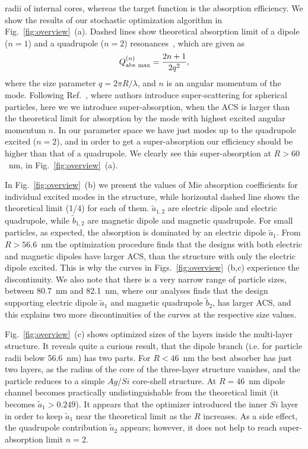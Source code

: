 \documentclass[aps,prl,twocolumn,showpacs,superscriptaddress,groupedaddress]{revtex4-1}
\begin{document}
radii of internal cores, whereas the target function is the absorption
efficiency.  We show the results of our stochastic optimization algorithm
in Fig.~\ref{fig:overview}~(a).  Dashed lines show theoretical absorption
limit of a dipole ($n=1$) and a quadrupole ($n=2$)
resonances~\cite{Tribelsky-2011}, which are given as $$Q^{(n)}_{\rm
  abs\ max}=\frac{2n+1}{2q^2},$$ where the size parameter $q=2\pi
R/\lambda$, and $n$ is an angular momentum of the mode. Following
Ref.~\cite{Fan-2011}, where authors introduce super-scattering for
spherical particles, here we we introduce super-absorption, when the
ACS is larger than the theoretical limit for absorption by the mode
with highest excited angular momentum $n$. In our parameter space we
have just modes up to the quadrupole excited ($n=2$), and in order to
get a super-absorption our efficiency should be higher than that of a
quadrupole. We clearly see this super-absorption at $R>60$~nm, in
Fig.~\ref{fig:overview}~(a).

In Fig.~\ref{fig:overview}~(b) we present the values of Mie absorption
coefficients for individual excited modes in the structure, while
horizontal dashed line shows the theoretical limit (1/4) for each of
them. $\tilde{a}_{1,2}$ are electric dipole and electric quadrupole,
while $\tilde{b}_{1,2}$ are magnetic dipole and magnetic
quadrupole. For small particles, as expected, the absorption is
dominated by an electric dipole $\tilde{a}_1$.  From $R >
56.6$~nm the optimization procedure finds that the designs with both
electric and magnetic dipoles have larger ACS, than the structure with
only the electric dipole excited. This is why the curves in
Figs.~\ref{fig:overview}~(b,c) experience the discontinuity. We also
note that there is a very narrow range of particle sizes, between
80.7~nm and 82.1~nm, where our analyses finds that the design
supporting electric dipole $\tilde{a}_1$ and magnetic quadrupole
$\tilde{b}_2$, has larger ACS, and this explains two more
discontinuities of the curves at the respective size values.

Fig.~\ref{fig:overview}~(c) shows optimized sizes of the layers inside
the multi-layer structure. It reveals quite a curious result, that the
dipole branch (i.e. for particle radii below 56.6~nm) has two
parts. For $R<46$~nm the best absorber has just two
layers, as the radius of the core of the three-layer structure
vanishes, and the particle reduces to a simple $Ag/Si$ core-shell structure.
At $R=46$~nm dipole channel becomes practically
undistinguishable from the theoretical limit (it becomes
$\tilde{a}_1>0.249$).  It appears that the optimizer introduced the
inner $Si$ layer in order to keep $\tilde{a}_1$ near the theoretical
limit as the $R$ increases.  As a side effect, the
quadrupole contribution $\tilde{a}_2$ appears; however, it does not
help to reach super-absorption limit $n=2$.
\end{document}
